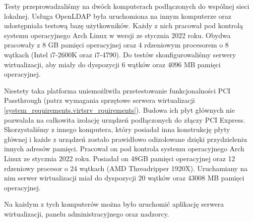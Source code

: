 \documentclass[../analiza-rozwiazania.tex]{subfiles}
\begin{document}
Testy przeprowadzaliśmy na dwóch komputerach podłączonych do wspólnej sieci lokalnej.
Usługa OpenLDAP była uruchomiona na innym komputerze oraz udostępniała testową bazę użytkowników.
Każdy z nich pracował pod kontrolą systemu operacyjnego Arch Linux w wersji ze stycznia 2022 roku.
Obydwa pracowały z 8 GB pamięci operacyjnej oraz 4 rdzeniowym procesorem o 8 wątkach (Intel i7-2600K oraz i7-4790).
Do testów skonfigurowaliśmy serwery wirtualizacji, aby miały do dyspozycji 6 wątków oraz 4096 MB pamięci operacyjnej.

Niestety taka platforma uniemożliwiła przetestowanie funkcjonalności PCI Passthrough (patrz wymagania sprzętowe serwera wirtualizacji \ref{system_requirements.virtsrv_rquirements}).
Budowa ich płyt głównych nie pozwalała na całkowita izolację urządzeń podłączonych do złączy PCI Express.
Skorzystaliśmy z innego komputera, który posiadał inna konstrukcję płyty głównej i każde z urządzeń zostało prawidłowo odizolowane dzięki przydzieleniu innych adresów pamięci.
Pracował on pod kontrola systemu operacyjnego Arch Linux ze stycznia 2022 roku.
Posiadał on 48GB pamięci operacyjnej oraz 12 rdzeniowy procesor o 24 wątkach (AMD Threadripper 1920X).
Uruchamiany na nim serwer wirtualizacji miał do dyspozycji 20 wątków oraz 43008 MB pamięci operacyjnej.

Na każdym z tych komputerów można było uruchomić aplikację serwera wirtualizacji, panelu administracyjnego oraz nadzorcy.
\end{document}
